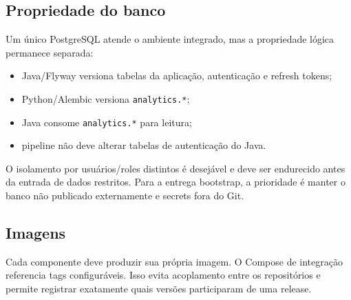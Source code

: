 \subsection{Propriedade do banco}

Um único PostgreSQL atende o ambiente integrado, mas a propriedade lógica permanece separada:

\begin{itemize}
    \item Java/Flyway versiona tabelas da aplicação, autenticação e refresh tokens;
    \item Python/Alembic versiona \texttt{analytics.*};
    \item Java consome \texttt{analytics.*} para leitura;
    \item pipeline não deve alterar tabelas de autenticação do Java.
\end{itemize}

O isolamento por usuários/roles distintos é desejável e deve ser endurecido antes da entrada de dados restritos. Para a entrega bootstrap, a prioridade é manter o banco não publicado externamente e secrets fora do Git.

\subsection{Imagens}

Cada componente deve produzir sua própria imagem. O Compose de integração referencia tags configuráveis. Isso evita acoplamento entre os repositórios e permite registrar exatamente quais versões participaram de uma release.
